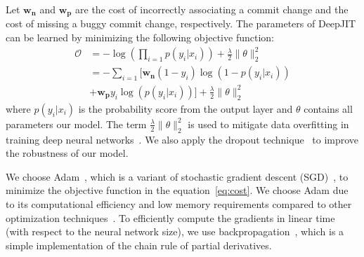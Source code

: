 Let $\textbf{w}_\textbf{n}$ and $\textbf{w}_\textbf{p}$ are the cost of incorrectly associating a commit change and the cost of missing a buggy commit change, respectively. The parameters of DeepJIT can be learned by minimizing the following objective function:
\begin{equation} %
\label{eq:cost}
\begin{split}
\mathcal{O} &= -\log\left( \prod_{i=1}^{} p(y_i|x_i) \right) + \frac{\lambda}{2} \|\theta\|_{2}^{2} \\
&= -\sum_{i=1}^{} [ \textbf{w}_\textbf{n} (1 - y_i) \log(1 - p(y_i|x_i)) \\ 
&+ \textbf{w}_\textbf{p} y_i \log (p(y_i|x_i)) ] + \frac{\lambda}{2} \|\theta\|_{2}^{2}
\end{split}
\end{equation}
where $p(y_i|x_i)$ is the probability score from the output layer and $\theta$ contains all parameters our model. The term $\frac{\lambda}{2} \|\theta\|_{2}^{2}$ is used to mitigate data overfitting in training deep neural networks~\cite{caruana2001overfitting}. We also apply the dropout technique~\cite{srivastava2014dropout} to improve the robustness of our model. 

We choose Adam~\cite{kingma2014adam}, which is a variant of stochastic gradient descent (SGD)~\cite{bottou2010large}, to minimize the objective function in the equation~\ref{eq:cost}. We choose Adam due to its computational efficiency and low memory requirements compared to other optimization techniques~\cite{kingma2014adam, anthimopoulos2016lung, arora2018optimization}. To efficiently compute the gradients in linear time (with respect to the neural network size), we use backpropagation~\cite{hagan1994training}, which is a simple implementation of the chain rule of partial derivatives.
